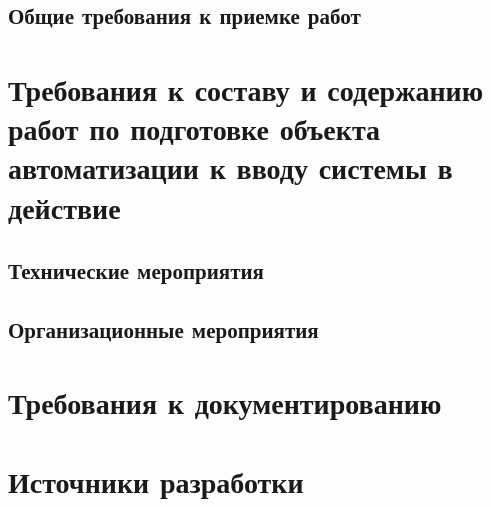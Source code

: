 \section{Общие требования к приемке работ}

\chapter{Требования к составу и содержанию работ по подготовке объекта автоматизации к вводу 
    системы в действие}
\section{Технические мероприятия}
\section{Организационные мероприятия}

\chapter{Требования к документированию}

\chapter{Источники разработки}

